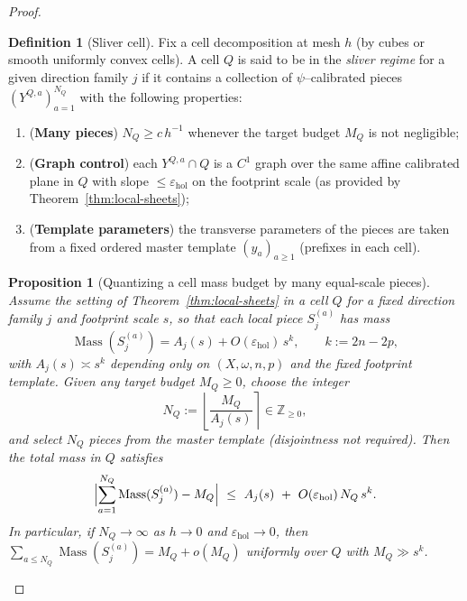 \documentclass[11pt]{article}
\numberwithin{equation}{section}  %
\theoremstyle{plain}
\newtheorem{proposition}[theorem]{Proposition}
\theoremstyle{definition}
\newtheorem{definition}[theorem]{Definition}
\theoremstyle{remark}
\newcommand{\Z}{\mathbb{Z}}
\DeclareMathOperator{\Mass}{Mass}
\begin{document}
\begin{proof}
\begin{definition}[Sliver cell]\label{def:sliver-cell}
Fix a cell decomposition at mesh $h$ (by cubes or smooth uniformly convex cells).
A cell $Q$ is said to be in the \emph{sliver regime} for a given direction family $j$ if it contains a collection of
$\psi$--calibrated pieces $(Y^{Q,a})_{a=1}^{N_Q}$ with the following properties:
\begin{enumerate}
\item[\textnormal{(a)}] (\textbf{Many pieces}) $N_Q\ge c\,h^{-1}$ whenever the target budget $M_Q$ is not negligible;
\item[\textnormal{(b)}] (\textbf{Graph control}) each $Y^{Q,a}\cap Q$ is a $C^1$ graph over the same affine calibrated plane
in $Q$ with slope $\le \varepsilon_{\mathrm{hol}}$ on the footprint scale (as provided by Theorem~\ref{thm:local-sheets});
\item[\textnormal{(c)}] (\textbf{Template parameters}) the transverse parameters of the pieces are taken from a fixed ordered master
template $(y_a)_{a\ge 1}$ (prefixes in each cell).
\end{enumerate}
\end{definition}



\begin{proposition}[Quantizing a cell mass budget by many equal-scale pieces]\label{prop:sliver-cell-mass-proportions}
Assume the setting of Theorem~\ref{thm:local-sheets} in a cell $Q$ for a fixed direction family $j$ and footprint scale $s$,
so that each local piece $S^{(a)}_j$ has mass
\[
\Mass(S^{(a)}_j)=A_j(s)+O(\varepsilon_{\mathrm{hol}})\,s^{k},\qquad k:=2n-2p,
\]
with $A_j(s)\asymp s^{k}$ depending only on $(X,\omega,n,p)$ and the fixed footprint template.
Given any target budget $M_Q\ge 0$, choose the integer
\[
N_Q:=\left\lfloor \frac{M_Q}{A_j(s)}\right\rceil \in \Z_{\ge 0},
\]
and select $N_Q$ pieces from the master template (disjointness not required).
Then the total mass in $Q$ satisfies
\[
\Bigl|\sum_{a=1}^{N_Q}\Mass(S^{(a)}_j)-M_Q\Bigr|\ \le\ A_j(s)\ +\ O(\varepsilon_{\mathrm{hol}})\,N_Q\,s^{k}.
\]
In particular, if $N_Q\to\infty$ as $h\to 0$ and $\varepsilon_{\mathrm{hol}}\to 0$, then
$\sum_{a\le N_Q}\Mass(S^{(a)}_j)=M_Q+o(M_Q)$ uniformly over $Q$ with $M_Q\gg s^{k}$.
\end{proposition}


\end{proof}
\end{document}
